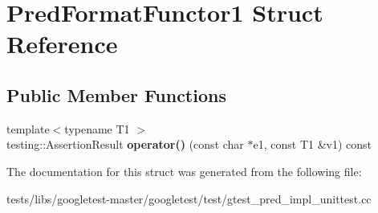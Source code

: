 \hypertarget{structPredFormatFunctor1}{}\section{Pred\+Format\+Functor1 Struct Reference}
\label{structPredFormatFunctor1}
\subsection*{Public Member Functions}
\begin{DoxyCompactItemize}
\item 
\mbox{\label{structPredFormatFunctor1_ac2c414b5fa65b41b0ab5967f9f1e5bff}} 
{\footnotesize template$<$typename T1 $>$ }\\testing\+::\+Assertion\+Result {\bfseries operator()} (const char $\ast$e1, const T1 \&v1) const
\end{DoxyCompactItemize}


The documentation for this struct was generated from the following file\+:\begin{DoxyCompactItemize}
\item 
tests/libs/googletest-\/master/googletest/test/gtest\+\_\+pred\+\_\+impl\+\_\+unittest.\+cc\end{DoxyCompactItemize}
